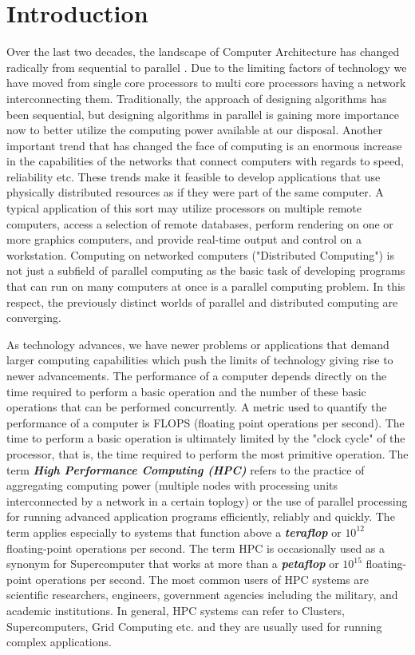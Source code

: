 \chapter{Introduction}\label{chapter:introduction}
Over the last two decades, the landscape of Computer Architecture has changed radically from sequential to parallel . Due to the limiting factors of technology we have moved from single core processors to multi core processors having a network interconnecting them. Traditionally, the approach of designing algorithms has been sequential, but designing algorithms in parallel is gaining more importance now to better utilize the computing power available at our disposal. Another important trend that has changed the face of computing is an enormous increase in the capabilities of the networks that connect computers with regards to speed, reliability etc. These trends make it feasible to develop applications that use physically distributed resources as if they were part of the same computer. A typical application of this sort may utilize processors on multiple remote computers, access a selection of remote databases, perform rendering on one or more graphics computers, and provide real-time output and control on a workstation. Computing on networked computers ("Distributed Computing") is not just a subfield of parallel computing as the basic task of developing programs that can run on many computers at once is a parallel computing problem. In this respect, the previously distinct worlds of parallel and distributed computing are converging.\\ \par
\noindent
As technology advances, we have newer problems or applications that demand larger computing capabilities which push the limits of technology giving rise to newer advancements. The performance of a computer depends directly on the time required to perform a basic operation and the number of these basic operations that can be performed concurrently. A metric used to quantify the performance of a computer is FLOPS (floating point operations per second). The time to perform a basic operation is ultimately limited by the "clock cycle" of the processor, that is, the time required to perform the most primitive operation. The term \textbf{\textit{High Performance Computing (HPC)}} refers to the practice of aggregating computing power (multiple nodes with processing units interconnected by a network in a certain toplogy) or the use of parallel processing for running advanced application programs efficiently, reliably and quickly. The term applies especially to systems that function above a \textbf{\textit{teraflop}} or \textbf{\textit{$10^{12}$}} floating-point operations per second. The term HPC is occasionally used as a synonym for Supercomputer that works at more than a \textbf{\textit{petaflop}} or \textbf{\textit{$10^{15}$}} floating-point operations per second. The most common users of HPC systems are scientific researchers, engineers, government agencies including the military, and academic institutions. In general, HPC systems can refer to Clusters, Supercomputers, Grid Computing etc. and they are usually used for running complex applications.\\ \par
